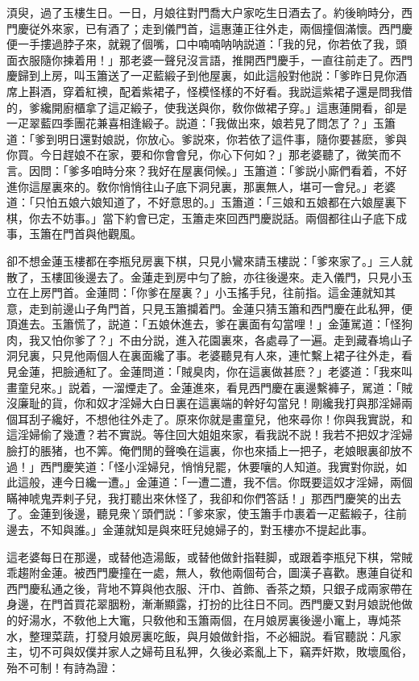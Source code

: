 湏臾，過了玉樓生日。一日，月娘往對門喬大户家吃生日酒去了。約後晌時分，西門慶従外來家，已有酒了；走到儀門首，這惠蓮正往外走，兩個撞個滿懷。西門慶便一手摟過脖子來，就親了個嘴，口中喃喃呐呐説道：「我的兒，你若依了我，頭面衣服隨你揀着用！」那老婆一聲兒沒言語，推開西門慶手，一直往前走了。西門慶歸到上房，叫玉簫送了一疋藍緞子到他屋裏，如此這般對他説：「爹昨日見你酒席上斟酒，穿着紅襖，配着紫裙子，怪模怪樣的不好看。我説這紫裙子還是問我借的，爹纔開廚櫃拿了這疋緞子，使我送與你，敎你做裙子穿。」這惠蓮開看，卻是一疋翠藍四季團花兼喜相逢緞子。説道：「我做出來，娘若見了問怎了？」玉簫道：「爹到明日還對娘説，你放心。爹説來，你若依了這件事，隨你要甚麽，爹與你買。今日趕娘不在家，要和你會會兒，你心下何如？」那老婆聽了，微笑而不言。因問：「爹多咱時分來？我好在屋裏伺候。」玉簫道：「爹説小廝們看着，不好進你這屋裏來的。敎你悄悄往山子底下洞兒裏，那裏無人，堪可一會兒。」老婆道：「只怕五娘六娘知道了，不好意思的。」玉簫道：「三娘和五娘都在六娘屋裏下棋，你去不妨事。」當下約會已定，玉簫走來回西門慶説話。兩個都往山子底下成事，玉簫在門首與他觀風。

卻不想金蓮玉樓都在李瓶兒房裏下棋，只見小鸞來請玉樓説：「爹來家了。」三人就散了，玉樓囬後邊去了。金蓮走到房中匀了臉，亦往後邊來。走入儀門，只見小玉立在上房門首。金蓮問：「你爹在屋裏？」小玉搖手兒，往前指。這金蓮就知其意，走到前邊山子角門首，只見玉簫攔着門。金蓮只猜玉簫和西門慶在此私狎，便頂進去。玉簫慌了，説道：「五娘休進去，爹在裏面有勾當哩！」金蓮駡道：「怪狗肉，我又怕你爹了？」不由分説，進入花園裏來，各處尋了一遍。走到藏春塢山子洞兒裏，只見他兩個人在裏面纔了事。老婆聽見有人來，連忙繫上裙子往外走，看見金蓮，把臉通紅了。金蓮問道：「賊臭肉，你在這裏做甚麽？」老婆道：「我來叫畫童兒來。」説着，一溜煙走了。金蓮進來，看見西門慶在裏邊繫褲子，駡道：「賊沒廉耻的貨，你和奴才淫婦大白日裏在這裏端的幹好勾當兒！剛纔我打與那淫婦兩個耳刮子纔好，不想他往外走了。原來你就是畫童兒，他來尋你！你與我實説，和這淫婦偷了幾遭？若不實説。等住回大姐姐來家，看我説不説！我若不把奴才淫婦臉打的脹猪，也不筭。俺們閒的聲喚在這裏，你也來插上一把子，老娘眼裏卻放不過！」西門慶笑道：「怪小淫婦兒，悄悄兒罷，休要嚷的人知道。我實對你説，如此這般，連今日纔一遭。」金蓮道：「一遭二遭，我不信。你既要這奴才淫婦，兩個瞞神唬鬼弄剌子兒，我打聽出來休怪了，我卻和你們答話！」那西門慶笑的出去了。金蓮到後邊，聽見衆丫頭們説：「爹來家，使玉簫手巾裹着一疋藍緞子，往前邊去，不知與誰。」金蓮就知是與來旺兒媳婦子的，對玉樓亦不提起此事。

這老婆每日在那邊，或替他造湯飯，或替他做針指鞋脚，或跟着李瓶兒下棋，常賊乖趨附金蓮。被西門慶撞在一處，無人，敎他兩個苟合，圖漢子喜歡。惠蓮自従和西門慶私通之後，背地不算與他衣服、汗巾、首飾、香茶之類，只銀子成兩家帶在身邊，在門首買花翠胭粉，漸漸顯露，打扮的比往日不同。西門慶又對月娘説他做的好湯水，不敎他上大竃，只敎他和玉簫兩個，在月娘房裏後邊小竃上，專炖茶水，整理菜蔬，打發月娘房裏吃飯，與月娘做針指，不必細説。看官聽説：凡家主，切不可與奴僕并家人之婦苟且私狎，久後必紊亂上下，竊弄奸欺，敗壞風俗，殆不可制！有詩為證：

